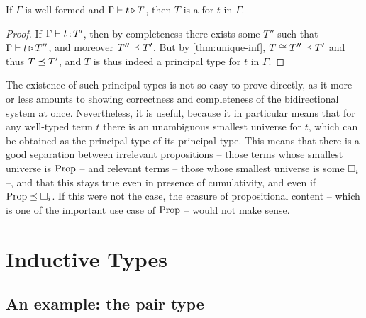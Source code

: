 \begin{theorem}
  \label{thm:princ-types}
  If $\Gamma$ is well-formed and $\Gamma \vdash t \operatorname{\triangleright} T$,
  then $T$ is a  for $t$ in $\Gamma$.
\end{theorem}
  
\begin{proof}
  If $\Gamma \vdash t \operatorname{:} T'$, then by completeness there exists some $T''$ such that
  $\Gamma \vdash t \operatorname{\triangleright} T''$, and moreover $T'' \preceq T'$.
  But by \cref{thm:unique-inf}, $T \cong T'' \preceq T'$ and thus $T \preceq T'$, and $T$ is thus indeed a principal type for $t$ in $\Gamma$.
\end{proof}

The existence of such principal types is not so easy to prove directly, as it more or less
amounts to showing correctness and completeness of the bidirectional system at once.
Nevertheless, it is useful, because it in particular means that for any well-typed term $t$ there is an unambiguous smallest universe for $t$, which can be obtained as the principal
type of its principal type. This means that there is a good separation between irrelevant 
propositions – those terms whose smallest universe is $\operatorname{Prop}$ – and relevant terms
– those whose smallest universe is some $\uni[i]$ –, and that this stays true even in
presence of cumulativity, and even if $\Prop \cum \uni[i]$. If this were not the case,
the erasure of propositional content – which is one of the important use case of $\operatorname{Prop}$ –
would not make sense.

\section{Inductive Types}
\label{sec:bidir-pcuic-inductives}

\subsection{An example: the pair type}

